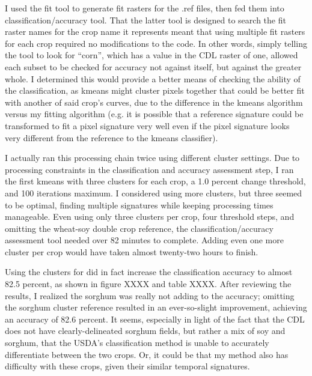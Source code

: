 I used the fit tool to generate fit rasters for the .ref files, then fed them into classification/accuracy tool. That the latter tool is designed to search the fit raster names for the crop name it represents meant that using multiple fit rasters for each crop required no modifications to the code. In other words, simply telling the tool to look for “corn”, which has a value in the CDL raster of one, allowed each subset to be checked for accuracy not against itself, but against the greater whole. I determined this would provide a better means of checking the ability of the classification, as kmeans might cluster pixels together that could be better fit with another of said crop’s curves, due to the difference in the kmeans algorithm versus my fitting algorithm (e.g. it is  possible that a reference signature could be transformed to fit a pixel signature very well even if the pixel signature looks very different from the reference to the kmeans classifier).

I actually ran this processing chain twice using different cluster settings. Due to processing constraints in the classification and accuracy assessment step, I ran the first kmeans with three clusters for each crop, a 1.0 percent change threshold, and 100 iterations maximum. I considered using more clusters, but three seemed to be optimal, finding multiple signatures while keeping processing times manageable. Even using only three clusters per crop, four threshold steps, and omitting the wheat-soy double crop reference, the classification/accuracy assessment tool needed over 82 minutes to complete. Adding even one more cluster per crop would have taken almost twenty-two hours to finish.

Using the clusters for did in fact increase the classification accuracy to almost 82.5 percent, as shown in figure XXXX and table XXXX. After reviewing the results, I realized the sorghum was really not adding to the accuracy; omitting the sorghum cluster reference resulted in an ever-so-slight improvement, achieving an accuracy of 82.6 percent. It seems, especially in light of the fact that the CDL does not have clearly-delineated sorghum fields, but rather a mix of soy and sorghum, that the USDA’s classification method is unable to accurately differentiate between the two crops. Or, it could be that my method also has difficulty with these crops, given their similar temporal signatures. %

